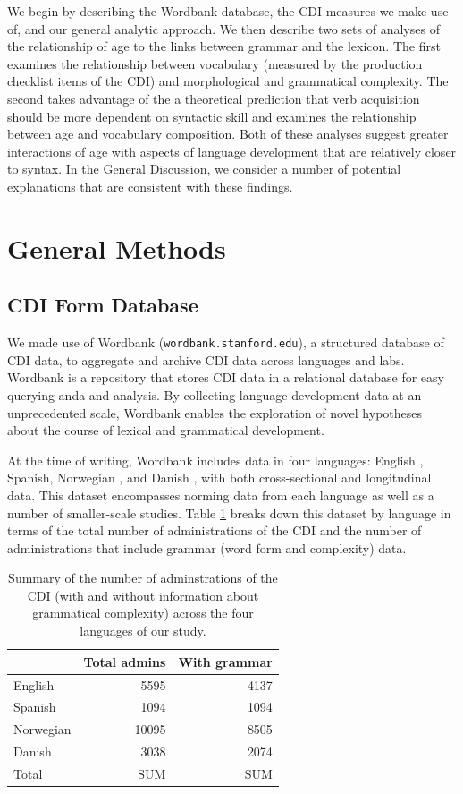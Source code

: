 \documentclass[10pt,letterpaper]{article}
\begin{document}
We begin by describing the Wordbank database, the CDI measures we make use of, and our general analytic approach. We then describe two sets of analyses of the relationship of age to the links between grammar and the lexicon. The first examines the relationship between vocabulary (measured by the production checklist items of the CDI) and morphological and grammatical complexity. The second takes advantage of the a theoretical prediction that verb acquisition should be more dependent on syntactic skill \cite{gleitman1990} and examines the relationship between age and vocabulary composition. Both of these analyses suggest greater interactions of age with aspects of language development that are relatively closer to syntax. In the General Discussion, we consider a number of potential explanations that are consistent with these findings. 

\section{General Methods}

\subsection{CDI Form Database}

We made use of Wordbank (\texttt{wordbank.stanford.edu}), a structured database of CDI data, to aggregate and archive CDI data across languages and labs. Wordbank is a repository that stores CDI data in a relational database for easy querying anda and analysis. By collecting language development data at an unprecedented scale, Wordbank enables the exploration of novel hypotheses about the course of lexical and grammatical development. 

At the time of writing, Wordbank includes data in four languages: English \cite{fenson2007}, Spanish, Norwegian \cite{kristoffersen2013,simonsen2014}, and Danish \cite{andersen2006}, with both cross-sectional and longitudinal data. This dataset encompasses norming data from each language as well as a number of smaller-scale studies. Table \ref{table:num} breaks down this dataset by language in terms of the total number of administrations of the CDI and the number of administrations that include grammar (word form and complexity) data.


\begin{table}[t]
\begin{center}
\begin{tabular}{lrr}
\hline
& Total admins & With grammar\\ 
\hline
English & 5595 & 4137\\ 
Spanish & 1094 & 1094\\ 
Norwegian & 10095 & 8505\\ 
Danish & 3038 & 2074\\ 
\hline
Total & SUM & SUM \\
\hline
\end{tabular}
\end{center}
\caption{\label{table:num} Summary of the number of adminstrations of the CDI (with and without information about grammatical complexity) across the four languages of our study.}
\end{table}
\end{document}

